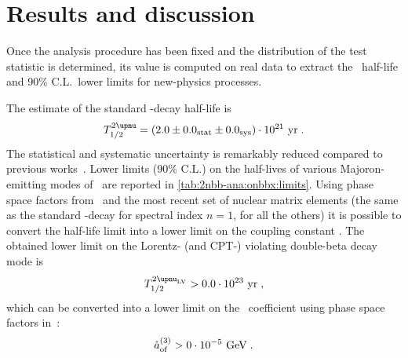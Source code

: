 \begin{table}
  \centering
  \caption{%
    Summary of the systematic uncertainties affecting the \nnbb\ distribution analysis.
  }\label{tab:2nbb-ana:systematics}
  
\end{table}

\section{Results and discussion}%
\label{sec:2nbb-ana:results}

Once the analysis procedure has been fixed and the distribution of the test statistic is
determined, its value is computed on real data to extract the \nnbb\ half-life and 90\%
C.L.~lower limits for new-physics processes.

The estimate of the standard \nnbb-decay half-life is
\[
  \thalftwoM = (2.0 \pm \stat{0.0} \pm \syst{0.0}) \cdot 10^{21}~\text{yr} \;.
\]
The statistical and systematic uncertainty is remarkably reduced compared to previous
works~\cite{Agostini2015a}.
\newpar
Lower limits (90\% C.L.) on the half-lives of various Majoron-emitting modes of \onbb\ are
reported in \cref{tab:2nbb-ana:onbbx:limits}. Using phase space factors
from~\cite{Kotila2015} and the most recent set of nuclear matrix elements (the same as the
standard \onbb-decay for spectral index $n=1$, \cite{Hirsch1995} for all the others) it is
possible to convert the half-life limit into a lower limit on the coupling constant \ga.
\newpar
The obtained lower limit on the Lorentz- (and CPT-) violating double-beta decay mode is
\[
  \thalflvM > 0.0 \cdot 10^{23}~\text{yr} \;,
\]
which can be converted into a lower limit on the \aof\ coefficient using phase space
factors in~\cite{Nitescu2020}:
\[
  {\mathring{a}_\text{of}^{(3)}} > 0 \cdot 10^{-5}~\text{GeV} \;.
\]


\begin{table}
  \centering
  \caption{%
    90\% C.L.~lower limits for new physics processes contributing to the \nnbb\ event
    distribution. Nuclear matrix elements for $n=1$ are the same as the standard \onbb,
    and have been therefore selected from the most recent nuclear calculations. Matrix
    elements for the other decay modes have been taken from~\cite{Hirsch1995}. Phase space
    factors have been taken from~\cite{Kotila2015}. 
  }\label{tab:2nbb-ana:onbbx:limits}
  
\end{table}

